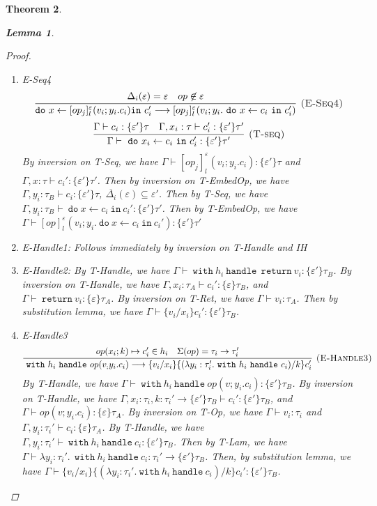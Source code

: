 \documentclass{article}
\newtheorem{theorem}{Theorem}[section]
\newtheorem{lemma}[theorem]{Lemma}
\newcommand{\m}[1]{\ \texttt{#1}\ }
\begin{document}
\begin{theorem}
\begin{lemma}
\begin{proof}
\begin{enumerate}
\item E-Seq4
$$
\infer[\textsc{(E-Seq4)}]
  {\texttt{do}\ x \leftarrow [op_j]^\varepsilon_l(v_i; y_i.c_i) \texttt{in}\ c_i' \longrightarrow [op_j]^\varepsilon_l(v_i; y_i. \m{do} x \leftarrow c_i \m{in} c_i')}
  {\Delta_i(\varepsilon) = \varepsilon & op \not \in \varepsilon} $$
$$
\infer[\textsc{(T-seq)}]
  {\Gamma\vdash \m{do} x_i \leftarrow c_i \m{in} c_i' : \{\varepsilon'\}\tau' }
  {\Gamma \vdash c_i : \{\varepsilon'\}\tau & \Gamma, x_i:\tau \vdash c_i': \{\varepsilon'\}\tau'}  $$
By inversion on T-Seq, we have $\Gamma \vdash [op_j]^\varepsilon_l(v_i; y_i.c_i): \{\varepsilon'\}\tau$ and $\Gamma, x:\tau \vdash c_i' : \{\varepsilon'\} \tau'$. Then by inversion on T-EmbedOp, we have $\Gamma, y_i:\tau_B \vdash c_i: \{\varepsilon'\}\tau$, $\overline{\Delta_i}(\varepsilon) \subseteq \varepsilon'$.
Then by T-Seq, we have $\Gamma, y_i:\tau_B \vdash \m{do} x \leftarrow c_i \m{in} c_i' : \{\varepsilon'\}\tau'$. Then by T-EmbedOp, we have $\Gamma \vdash [op]^\varepsilon_l(v_i; y_i.  \m{do} x \leftarrow c_i \m{in} c_i' ): \{\varepsilon'\}\tau'$

\item E-Handle1: Follows immediately by inversion on T-Handle and IH
\item E-Handle2: By T-Handle, we have $\Gamma \vdash \m{with} h_i \m{handle} \m{return} v_i :  \{\varepsilon'\}\tau_B$. By inversion on T-Handle, we have $\Gamma, x_i:\tau_A \vdash c_i' : \{\varepsilon\}\tau_B$, and $\Gamma \vdash \m{return} v_i : \{\varepsilon\} \tau_A$. By inversion on T-Ret, we have $\Gamma \vdash v_i : \tau_A$. Then by substitution lemma, we have $\Gamma \vdash \{v_i/x_i\}c_i' : \{\varepsilon'\}\tau_B$. 

\item E-Handle3
$$
\infer[\textsc{(E-Handle3)}]
  {\m{with} h_i \m{handle} op(v_; y_i.c_i) \longrightarrow \{v_i/x_i\} \{(\lambda y_i: \tau_i'.
   \m{with} h_i\m{handle} c_i) / k\}c_i' }
  {op(x_i; k) \mapsto c_i' \in h_i & \Sigma(op) = \tau_i \rightarrow \tau_i'} 
$$
By T-Handle, we have $\Gamma \vdash \m{with} h_i \m{handle} op(v;y_i.c_i) :  \{\varepsilon'\}\tau_B$. By inversion on T-Handle, we have $\Gamma, x_i:\tau_i, k: \tau_i' \rightarrow \{\varepsilon'\}\tau_B \vdash c_i' : \{\varepsilon'\} \tau_B$, and $\Gamma \vdash op(v; y_i.c_i) : \{\varepsilon\} \tau_A$. By inversion on T-Op, we have $\Gamma \vdash v_i : \tau_i$ and $\Gamma, y_i: \tau_i' \vdash c_i: \{\varepsilon\}\tau_A$. By T-Handle, we have $\Gamma, y_i: \tau_i' \vdash \m{with} h_i \m{handle} c_i : \{\varepsilon'\}\tau_B$. Then by T-Lam, we have $\Gamma \vdash \lambda y_i:\tau_i'.\ \m{with} h_i \m{handle} c_i : \tau_i' \rightarrow  \{\varepsilon'\}\tau_B$. Then, by substitution lemma, we have $\Gamma \vdash \{v_i/x_i\} \{(\lambda y_i: \tau_i'.
   \m{with} h_i\m{handle} c_i) / k\}c_i' : \{\varepsilon'\}\tau_B$.
   

\end{enumerate}
\end{proof}
\end{lemma}
\end{theorem}
\end{document}
